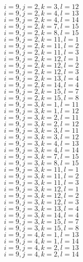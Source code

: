 \documentclass[14pt]{article}
\begin{document}
    $i=9,j=2,k=3,l=12 $ \\ 
    $i=9,j=2,k=4,l=13 $ \\ 
    $i=9,j=2,k=4,l=14 $ \\ 
    $i=9,j=2,k=7,l=15 $ \\ 
    $i=9,j=2,k=8,l=15 $ \\ 
    $i=9,j=2,k=11,l=1 $ \\ 
    $i=9,j=2,k=11,l=2 $ \\ 
    $i=9,j=2,k=11,l=3 $ \\ 
    $i=9,j=2,k=12,l=1 $ \\ 
    $i=9,j=2,k=12,l=2 $ \\ 
    $i=9,j=2,k=12,l=3 $ \\ 
    $i=9,j=2,k=13,l=4 $ \\ 
    $i=9,j=2,k=14,l=4 $ \\ 
    $i=9,j=2,k=15,l=7 $ \\ 
    $i=9,j=2,k=15,l=8 $ \\ 
    $i=9,j=3,k=1,l=11 $ \\ 
    $i=9,j=3,k=1,l=12 $ \\ 
    $i=9,j=3,k=2,l=11 $ \\ 
    $i=9,j=3,k=2,l=12 $ \\ 
    $i=9,j=3,k=3,l=11 $ \\ 
    $i=9,j=3,k=3,l=12 $ \\ 
    $i=9,j=3,k=4,l=13 $ \\ 
    $i=9,j=3,k=4,l=14 $ \\ 
    $i=9,j=3,k=7,l=15 $ \\ 
    $i=9,j=3,k=8,l=15 $ \\ 
    $i=9,j=3,k=11,l=1 $ \\ 
    $i=9,j=3,k=11,l=2 $ \\ 
    $i=9,j=3,k=11,l=3 $ \\ 
    $i=9,j=3,k=12,l=1 $ \\ 
    $i=9,j=3,k=12,l=2 $ \\ 
    $i=9,j=3,k=12,l=3 $ \\ 
    $i=9,j=3,k=13,l=4 $ \\ 
    $i=9,j=3,k=14,l=4 $ \\ 
    $i=9,j=3,k=15,l=7 $ \\ 
    $i=9,j=3,k=15,l=8 $ \\ 
    $i=9,j=4,k=1,l=13 $ \\ 
    $i=9,j=4,k=1,l=14 $ \\ 
    $i=9,j=4,k=2,l=13 $ \\ 
    $i=9,j=4,k=2,l=14 $ \\ 
\end{document}
